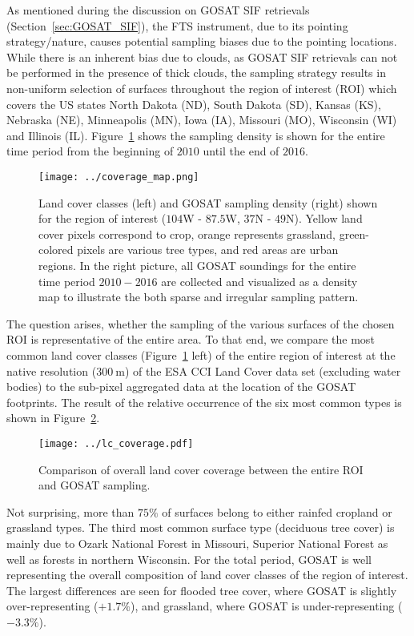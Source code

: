 \documentclass[preprint, a4paper, 10pt, times]{elsarticle}
\begin{document}
As mentioned during the discussion on GOSAT SIF retrievals (Section~\ref{sec:GOSAT_SIF}), the FTS instrument, due to its pointing strategy/nature, causes potential sampling biases due to the pointing locations. While there is an inherent bias due to clouds, as GOSAT SIF retrievals can not be performed in the presence of thick clouds, the sampling strategy results in non-uniform selection of surfaces throughout the region of interest (ROI) which covers the US states North Dakota (ND), South Dakota (SD), Kansas (KS), Nebraska (NE), Minneapolis (MN), Iowa (IA), Missouri (MO), Wisconsin (WI) and Illinois (IL). Figure~\ref{fig:sampling} shows the sampling density is shown for the entire time period from the beginning of $2010$ until the end of $2016$. 

\begin{figure}[htbp]
\centering
\texttt{[image: ../coverage\_map.png]}
\caption{Land cover classes (left) and GOSAT sampling density (right) shown for the region of interest ($104$W - $87.5$W, $37$N - $49$N). Yellow land cover pixels correspond to crop, orange represents grassland, green-colored pixels are various tree types, and red areas are urban regions. In the right picture, all GOSAT soundings for the entire time period $2010-2016$ are collected and visualized as a density map to illustrate the both sparse and irregular sampling pattern.}
\label{fig:sampling}
\end{figure}

The question arises, whether the sampling of the various surfaces of the chosen ROI is representative of the entire area. To that end, we compare the most common land cover classes (Figure~\ref{fig:sampling} left) of the entire region of interest at the native resolution ($300\:\mathrm{m}$) of the ESA CCI Land Cover data set (excluding water bodies) to the sub-pixel aggregated data at the location of the GOSAT footprints. The result of the relative occurrence of the six most common types is shown in Figure~\ref{fig:lc_coverage}. 

\begin{figure}[htbp]
\centering
\texttt{[image: ../lc\_coverage.pdf]}
\caption{Comparison of overall land cover coverage between the entire ROI and GOSAT sampling.}
\label{fig:lc_coverage}
\end{figure}

Not surprising, more than $75\%$ of surfaces belong to either rainfed cropland or grassland types. The third most common surface type (deciduous tree cover) is mainly due to Ozark National Forest in Missouri, Superior National Forest as well as forests in northern Wisconsin. For the total period, GOSAT is well representing the overall composition of land cover classes of the region of interest. The largest differences are seen for flooded tree cover, where GOSAT is slightly over-representing ($+1.7\%$), and grassland, where GOSAT is under-representing ($-3.3\%$).
\end{document}
